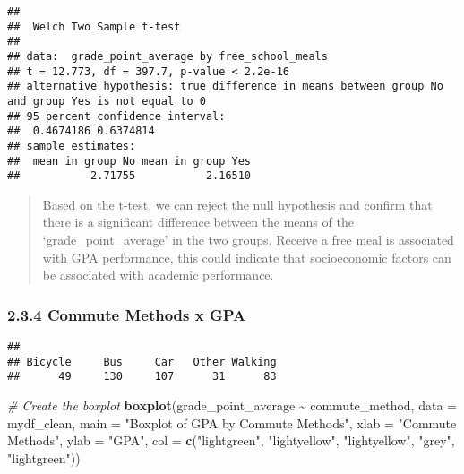 \documentclass[
]{article}
\newenvironment{Shaded}{\begin{snugshade}}{\end{snugshade}}
\newcommand{\AttributeTok}[1]{\textcolor[rgb]{0.13,0.29,0.53}{#1}}
\newcommand{\CommentTok}[1]{\textcolor[rgb]{0.56,0.35,0.01}{\textit{#1}}}
\newcommand{\FunctionTok}[1]{\textcolor[rgb]{0.13,0.29,0.53}{\textbf{#1}}}
\newcommand{\NormalTok}[1]{#1}
\newcommand{\SpecialCharTok}[1]{\textcolor[rgb]{0.81,0.36,0.00}{\textbf{#1}}}
\newcommand{\StringTok}[1]{\textcolor[rgb]{0.31,0.60,0.02}{#1}}
\begin{document}
\begin{verbatim}
## 
##  Welch Two Sample t-test
## 
## data:  grade_point_average by free_school_meals
## t = 12.773, df = 397.7, p-value < 2.2e-16
## alternative hypothesis: true difference in means between group No and group Yes is not equal to 0
## 95 percent confidence interval:
##  0.4674186 0.6374814
## sample estimates:
##  mean in group No mean in group Yes 
##           2.71755           2.16510
\end{verbatim}

\begin{quote}
Based on the t-test, we can reject the null hypothesis and confirm that
there is a significant difference between the means of the
`grade\_point\_average' in the two groups. Receive a free meal is
associated with GPA performance, this could indicate that socioeconomic
factors can be associated with academic performance.
\end{quote}

\subsubsection{2.3.4 Commute Methods x GPA}\label{commute-methods-x-gpa}

\begin{Shaded}
\end{Shaded}

\begin{verbatim}
## 
## Bicycle     Bus     Car   Other Walking 
##      49     130     107      31      83
\end{verbatim}

\begin{Shaded}
\begin{Highlighting}[]
\CommentTok{\# Create the boxplot}
\FunctionTok{boxplot}\NormalTok{(grade\_point\_average }\SpecialCharTok{\textasciitilde{}}\NormalTok{ commute\_method, }
        \AttributeTok{data =}\NormalTok{ mydf\_clean, }
        \AttributeTok{main =} \StringTok{"Boxplot of GPA by Commute Methods"}\NormalTok{,}
        \AttributeTok{xlab =} \StringTok{"Commute Methods"}\NormalTok{,}
        \AttributeTok{ylab =} \StringTok{"GPA"}\NormalTok{,}
        \AttributeTok{col =} \FunctionTok{c}\NormalTok{(}\StringTok{"lightgreen"}\NormalTok{, }\StringTok{"lightyellow"}\NormalTok{, }\StringTok{"lightyellow"}\NormalTok{, }\StringTok{"grey"}\NormalTok{, }\StringTok{"lightgreen"}\NormalTok{))}
\end{Highlighting}
\end{Shaded}
\end{document}
